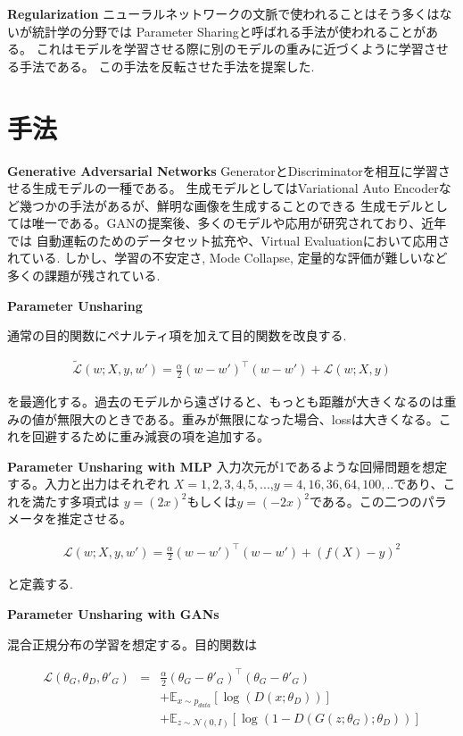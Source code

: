 \documentclass[techrep, submit, noauthor,preface]{ipsj}
\begin{document}
{\bf Regularization} ニューラルネットワークの文脈で使われることはそう多くはないが統計学の分野では
Parameter Sharing\cite{deeplearningbook}と呼ばれる手法が使われることがある。
これはモデルを学習させる際に別のモデルの重みに近づくように学習させる手法である。
この手法を反転させた手法を提案した.

\section{手法}

{\bf Generative Adversarial Networks} GeneratorとDiscriminatorを相互に学習させる生成モデルの一種である。
生成モデルとしてはVariational Auto Encoderなど幾つかの手法があるが、鮮明な画像を生成することのできる
生成モデルとしては唯一である。GANの提案後、多くのモデルや応用が研究されており、近年では
自動運転のためのデータセット拡充や、Virtual Evaluationにおいて応用されている.
しかし、学習の不安定さ, Mode Collapse, 定量的な評価が難しいなど多くの課題が残されている. 

{\bf Parameter Unsharing}

通常の目的関数にペナルティ項を加えて目的関数を改良する.

\begin{eqnarray}
  \label{unshare}
  \tilde{\mathcal{L}}(w; X, y, w') =  \frac{\alpha}{2} (w - w')^{\top}(w - w')+ \mathcal{L}(w; X, y)  
\end{eqnarray}


を最適化する。過去のモデルから遠ざけると、もっとも距離が大きくなるのは重みの値が無限大のときである。重みが無限になった場合、lossは大きくなる。これを回避するために重み減衰の項を追加する。


{\bf Parameter Unsharing with MLP}
入力次元が1であるような回帰問題を想定する。入力と出力はそれぞれ
$X = {1, 2, 3, 4, 5,...}$,$y = {4, 16, 36, 64, 100,..}$であり、これを満たす多項式は
$y = (2x)^{2}$もしくは$y = (-2x)^{2}$である。この二つのパラメータを推定させる。

\begin{eqnarray}
  \label{regression}
  \mathcal{L}(w; X, y, w') =  \frac{\alpha}{2} (w - w')^{\top}(w - w') + (f(X) - y)^{2} 
\end{eqnarray}      

と定義する.

{\bf Parameter Unsharing with GANs}

混合正規分布の学習を想定する。目的関数は

\begin{eqnarray}
  \label{gan}
  \mathcal{L}(\theta_{G}, \theta_{D}, \theta'_{G}) & = &  \frac{\alpha}{2} (\theta_{G} - \theta'_{G})^{\top}(\theta_{G} - \theta'_{G})   \nonumber \\
  & & +  \mathbb{E}_{x\sim p_{data}} [ \log(D(x; \theta_{D})) ]   \nonumber \\
  & & + \mathbb{E}_{z\sim \mathcal{N}(0, I)} [ \log(1 - D(G(z;\theta_{G}); \theta_{D})) ]
\end{eqnarray}
\end{document}
